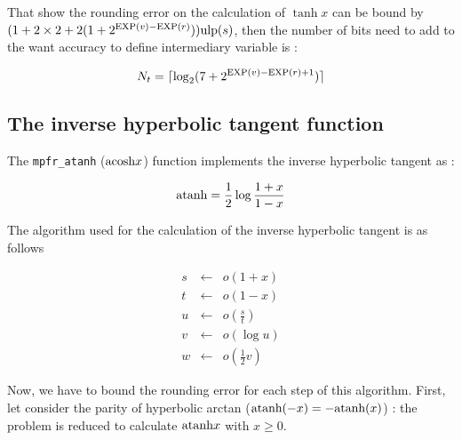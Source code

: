 \documentclass[12pt]{amsart}
\def\n{\textnormal}
\def\ulp{{\rm ulp}}
\def\Exp{{\rm EXP}}
\begin{document}
That show the rounding error on the calculation of $\tanh x$ can be
bound by $(1+2 \times 2+2(1+2^{\Exp(v)-\Exp(r)})) \ulp(s)$, then the
number of bits need to add to the want accuracy to define intermediary
variable is :

\[
N_t=\lceil \log_2(7+2^{\Exp(v)-\Exp(r)+1}) \rceil
\]





\subsection{The inverse hyperbolic tangent function}

The {\tt mpfr\_atanh} ($\n{acosh}{x}$) function implements the inverse hyperbolic tangent as :

$$
\n{atanh} = \frac{1}{2} \log \frac{1+x}{1-x} 
$$

The algorithm used for the calculation of the inverse hyperbolic tangent is as follows

\begin{eqnarray}\nonumber
s&\leftarrow&o(1+x)\\\nonumber
t&\leftarrow&o(1-x)\\\nonumber
u&\leftarrow&o(\frac{s}{t})\\\nonumber
v&\leftarrow&o(\log u)\\\nonumber
w&\leftarrow&o(\frac{1}{2} v)
\end{eqnarray}


Now, we have to bound the rounding error for each step of this
algorithm. First, let consider the parity of hyperbolic arctan
($\n{atanh}(-x)=-\n{atanh}(x)$) : the problem is reduced to calculate
$\n{atanh} x$ with $x \geq 0$.
\end{document}
